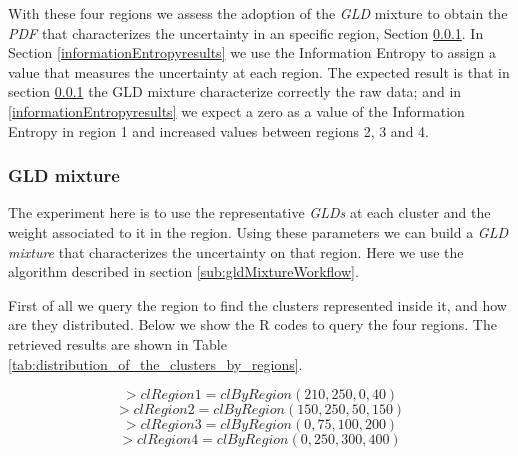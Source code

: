 With these four regions we assess the adoption of the \textit{GLD} mixture to obtain the \textit{PDF} that characterizes the uncertainty in an specific region, Section \ref{GLDmixtureresults}. In Section \ref{informationEntropyresults} we use the Information Entropy to assign a value that measures the uncertainty at each region. The expected result is that in section \ref{GLDmixtureresults} the GLD mixture characterize correctly the raw data; and in \ref{informationEntropyresults} we expect a zero as a value of the Information Entropy in region 1 and increased values between regions 2, 3 and 4.

\subsubsection{GLD mixture}\label{GLDmixtureresults}
The experiment here is to use the representative \textit{GLDs} at each cluster and the weight associated to it in the region. Using these parameters we can build a \textit{GLD mixture} that characterizes the uncertainty on that region. Here we use the algorithm described in section \ref{sub:gldMixtureWorkflow}.

First of all we query the region to find  the clusters represented inside it, and how are they distributed. Below we show the R codes to query the four regions. The retrieved results are shown in Table \ref{tab:distribution_of_the_clusters_by_regions}.

\begin{equation*}
> clRegion1 = clByRegion(210, 250, 0, 40)
\end{equation*}
\begin{equation*}
> clRegion2 = clByRegion(150, 250, 50, 150)
\end{equation*}
\begin{equation*}
> clRegion3 = clByRegion(0, 75, 100, 200)
\end{equation*}
\begin{equation*}
> clRegion4 = clByRegion(0, 250, 300, 400)
\end{equation*}

